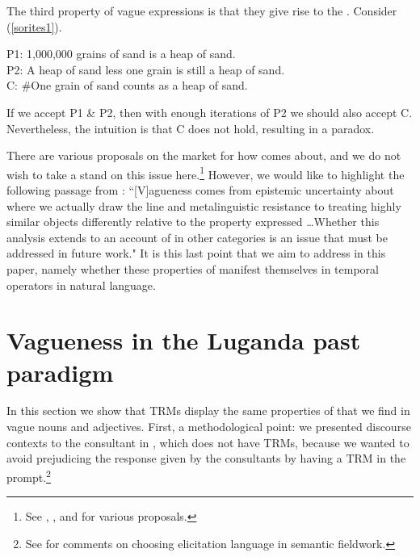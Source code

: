 \documentclass[output=paper,
modfonts
]{langscibook}
\begin{document}
The third property of vague expressions is that they give rise to the . Consider (\ref{sorites1}).



\ea\label{sorites1}
P1: 1,000,000 grains of sand is a heap of sand.\\
P2: A heap of sand less one grain is still a heap of sand.\\
C: \#One grain of sand counts as a heap of sand.
\z


\noindent If we accept P1 \& P2, then with enough iterations of P2 we should also accept C. Nevertheless, the intuition is that C does not hold, resulting in a paradox.



There are various proposals on the market for how  comes about, and we do not wish to take a stand on this issue here.\footnote{See \citealt{fara00shifting}, \citealt{grinsell12social}, \citealt{soames99understanding} and \citealt{williamson94vagueness} for various proposals.} However, we would like to highlight the following passage from \citet[p.~42]{kennedy07vagueness}: ``[V]agueness comes from epistemic uncertainty about where we actually draw the line and metalinguistic resistance to treating highly similar objects differently relative to the property expressed \dots Whether this analysis extends to an account of  in other categories is an issue that must be addressed in future work." It is this last point that we aim to address in this paper, namely whether these properties of  manifest themselves in temporal operators in natural language.







\section{Vagueness in the Luganda past paradigm}\label{sec:bochnakklecha:4}


In this section we show that  TRMs display the same properties of  that we find in vague nouns and adjectives. First, a methodological point: we presented discourse contexts to the consultant in , which does not have TRMs, because we wanted to avoid prejudicing the response given by the consultants by having a TRM in the prompt.\footnote{See \citet{anderbois15linguistically} for comments on choosing elicitation language in semantic fieldwork.}
\end{document}

